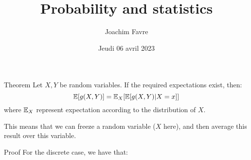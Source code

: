 \documentclass[a4paper]{article}
\title{Probability and statistics}
\author{Joachim Favre}
\date{Jeudi 06 avril 2023}
\begin{document}
\maketitle


\begin{parag}{Theorem}
    Let $X, Y$ be random variables. If the required expectations exist, then: 
    \[\exval\left[g\left(X, Y\right)\right] = \exval_X\left[\exval\left[g\left(X, Y\right) | X = x\right]\right]\] 
    where $\mathbb{E}_X$ represent expectation according to the distribution of $X$. 

    This means that we can freeze a random variable ($X$ here), and then average this result over this variable.

    \begin{subparag}{Proof}
        For the discrete case, we have that: 
    \end{subparag}
\end{parag}
\end{document}
